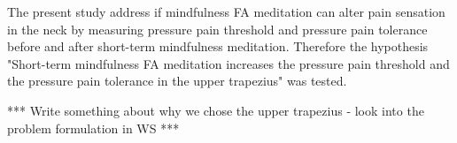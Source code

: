 The present study address if mindfulness FA meditation can alter pain sensation in the neck by measuring pressure pain threshold and pressure pain tolerance before and after short-term mindfulness meditation.
Therefore the hypothesis "Short-term mindfulness FA meditation increases the pressure pain threshold and the pressure pain tolerance in the upper trapezius" was tested.

*** Write something about why we chose the upper trapezius - look into the problem formulation in WS ***
